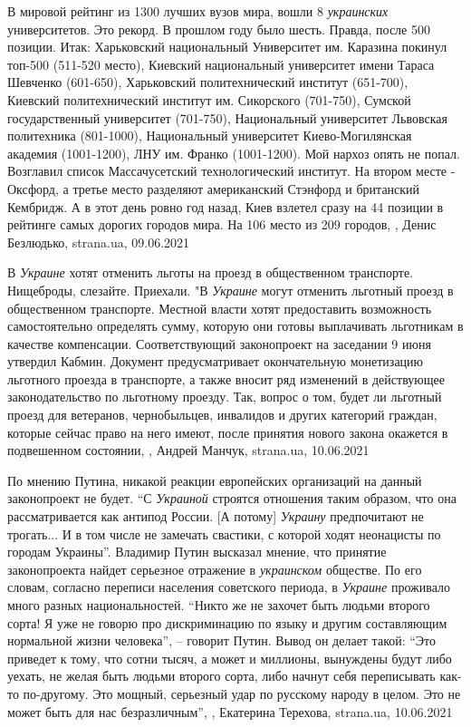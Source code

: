 В мировой рейтинг из 1300 лучших вузов мира, вошли 8 \emph{украинских}
университетов.  Это рекорд. В прошлом году было шесть. Правда, после 500
позиции. Итак: Харьковский национальный Университет им. Каразина покинул
топ-500 (511-520 место), Киевский национальный университет имени Тараса
Шевченко (601-650), Харьковский политехнический институт (651-700), Киевский
политехнический институт им. Сикорского (701-750), Сумской государственный
университет (701-750), Национальный университет Львовская политехника
(801-1000), Национальный университет Киево-Могилянская академия (1001-1200),
ЛНУ им. Франко (1001-1200). Мой нархоз опять не попал. Возглавил список
Массачусетский технологический институт. На втором месте - Оксфорд, а третье
место разделяют американский Стэнфорд и британский Кембридж.  А в этот день
ровно год назад, Киев взлетел сразу на 44 позиции в рейтинге самых дорогих
городов мира. На 106 место из 209 городов,
, Денис Безлюдько, strana.ua, 09.06.2021

В \emph{Украине} хотят отменить льготы на проезд в общественном транспорте.
Нищеброды, слезайте. Приехали. "В \emph{Украине} могут отменить льготный проезд в
общественном транспорте. Местной власти хотят предоставить возможность
самостоятельно определять сумму, которую они готовы выплачивать льготникам в
качестве компенсации.  Соответствующий законопроект на заседании 9 июня
утвердил Кабмин. Документ предусматривает окончательную монетизацию льготного
проезда в транспорте, а также вносит ряд изменений в действующее
законодательство по льготному проезду.  Так, вопрос о том, будет ли льготный
проезд для ветеранов, чернобыльцев, инвалидов и других категорий граждан,
которые сейчас право на него имеют, после принятия нового закона окажется в
подвешенном состоянии,
, 
Андрей Манчук, strana.ua, 10.06.2021

По мнению Путина, никакой реакции европейских организаций на данный
законопроект не будет. \enquote{С \emph{Украиной} строятся отношения таким
образом, что она рассматривается как антипод России. [А потому] \emph{Украину}
предпочитают не трогать... И в том числе не замечать свастики, с которой ходят
неонацисты по городам Украины}.  Владимир Путин высказал мнение, что принятие
законопроекта найдет серьезное отражение в \emph{украинском} обществе. По его
словам, согласно переписи населения советского периода, в \emph{Украине}
проживало много разных национальностей. \enquote{Никто же не захочет быть
людьми второго сорта! Я уже не говорю про дискриминацию по языку и другим
составляющим нормальной жизни человека}, – говорит Путин.  Вывод он делает
такой: \enquote{Это приведет к тому, что сотни тысяч, а может и миллионы,
вынуждены будут либо уехать, не желая быть людьми второго сорта, либо начнут
себя переписывать как-то по-другому. Это мощный, серьезный удар по русскому
народу в целом. Это не может быть для нас безразличным},
, 
Екатерина Терехова, strana.ua, 10.06.2021


